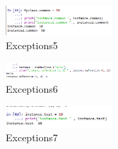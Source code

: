 \hfill\break
	\begin{figure}[H]
		\centering
		\includegraphics[width=4cm]{figures/kelompok1/1/dzihan/class5.PNG}
		\caption{Exceptions5}
	\end{figure}
\hfill\break


\hfill\break
	\begin{figure}[H]
		\centering
		\includegraphics[width=4cm]{figures/kelompok1/1/dzihan/class6.PNG}
		\caption{Exceptions6}
	\end{figure}
\hfill\break


\hfill\break
	\begin{figure}[H]
		\centering
		\includegraphics[width=4cm]{figures/kelompok1/1/dzihan/class7.PNG}
		\caption{Exceptions7}
	\end{figure}
